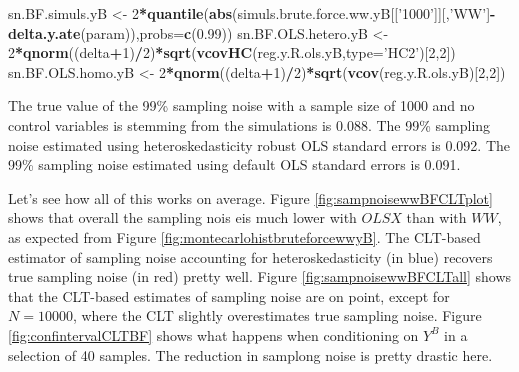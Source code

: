 \documentclass[]{book}
\newenvironment{Shaded}{\begin{snugshade}}{\end{snugshade}}
\newcommand{\KeywordTok}[1]{\textcolor[rgb]{0.13,0.29,0.53}{\textbf{#1}}}
\newcommand{\DataTypeTok}[1]{\textcolor[rgb]{0.13,0.29,0.53}{#1}}
\newcommand{\DecValTok}[1]{\textcolor[rgb]{0.00,0.00,0.81}{#1}}
\newcommand{\FloatTok}[1]{\textcolor[rgb]{0.00,0.00,0.81}{#1}}
\newcommand{\StringTok}[1]{\textcolor[rgb]{0.31,0.60,0.02}{#1}}
\newcommand{\OperatorTok}[1]{\textcolor[rgb]{0.81,0.36,0.00}{\textbf{#1}}}
\newcommand{\NormalTok}[1]{#1}
\theoremstyle{definition}
\theoremstyle{definition}
\theoremstyle{definition}
\theoremstyle{remark}
\begin{document}
\begin{Shaded}
\begin{Highlighting}[]
\NormalTok{sn.BF.simuls.yB <-}\StringTok{ }\DecValTok{2}\OperatorTok{*}\KeywordTok{quantile}\NormalTok{(}\KeywordTok{abs}\NormalTok{(simuls.brute.force.ww.yB[[}\StringTok{'1000'}\NormalTok{]][,}\StringTok{'WW'}\NormalTok{]}\OperatorTok{-}\KeywordTok{delta.y.ate}\NormalTok{(param)),}\DataTypeTok{probs=}\KeywordTok{c}\NormalTok{(}\FloatTok{0.99}\NormalTok{))}
\NormalTok{sn.BF.OLS.hetero.yB <-}\StringTok{ }\DecValTok{2}\OperatorTok{*}\KeywordTok{qnorm}\NormalTok{((delta}\OperatorTok{+}\DecValTok{1}\NormalTok{)}\OperatorTok{/}\DecValTok{2}\NormalTok{)}\OperatorTok{*}\KeywordTok{sqrt}\NormalTok{(}\KeywordTok{vcovHC}\NormalTok{(reg.y.R.ols.yB,}\DataTypeTok{type=}\StringTok{'HC2'}\NormalTok{)[}\DecValTok{2}\NormalTok{,}\DecValTok{2}\NormalTok{])}
\NormalTok{sn.BF.OLS.homo.yB <-}\StringTok{ }\DecValTok{2}\OperatorTok{*}\KeywordTok{qnorm}\NormalTok{((delta}\OperatorTok{+}\DecValTok{1}\NormalTok{)}\OperatorTok{/}\DecValTok{2}\NormalTok{)}\OperatorTok{*}\KeywordTok{sqrt}\NormalTok{(}\KeywordTok{vcov}\NormalTok{(reg.y.R.ols.yB)[}\DecValTok{2}\NormalTok{,}\DecValTok{2}\NormalTok{])}
\end{Highlighting}
\end{Shaded}

The true value of the 99\% sampling noise with a sample size of 1000 and
no control variables is stemming from the simulations is 0.088. The 99\%
sampling noise estimated using heteroskedasticity robust OLS standard
errors is 0.092. The 99\% sampling noise estimated using default OLS
standard errors is 0.091.

Let's see how all of this works on average. Figure
\ref{fig:sampnoisewwBFCLTplot} shows that overall the sampling nois eis
much lower with \(OLSX\) than with \(WW\), as expected from Figure
\ref{fig:montecarlohistbruteforcewwyB}. The CLT-based estimator of
sampling noise accounting for heteroskedasticity (in blue) recovers true
sampling noise (in red) pretty well. Figure
\ref{fig:sampnoisewwBFCLTall} shows that the CLT-based estimates of
sampling noise are on point, except for \(N=10000\), where the CLT
slightly overestimates true sampling noise. Figure
\ref{fig:confintervalCLTBF} shows what happens when conditioning on
\(Y^B\) in a selection of 40 samples. The reduction in samplong noise is
pretty drastic here.
\end{document}

